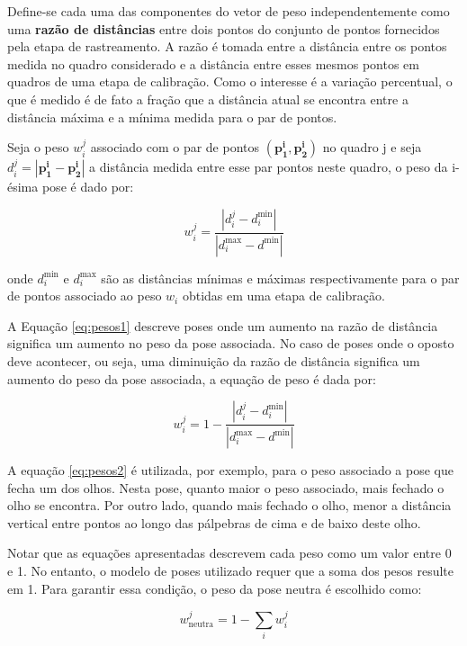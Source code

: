 Define-se cada uma das componentes do vetor de peso independentemente como uma \textbf{razão de distâncias} entre dois pontos do conjunto de pontos fornecidos pela etapa de rastreamento. A razão é tomada entre a distância entre os pontos medida no quadro considerado e a distância entre esses mesmos pontos em quadros de uma etapa de calibração. Como o interesse é a variação percentual, o que é medido é de fato a fração que a distância atual se encontra entre a distância máxima e a mínima medida para o par de pontos.

Seja o peso $w_i^j$ associado com o par de pontos $(\bm{p_1^i}, \bm{p_2^i})$ no quadro j e seja $d_i^j = |\bm{p_1^i} - \bm{p_2^i}|$ a distância medida entre esse par pontos neste quadro, o peso da i-ésima pose é dado por:

\begin{equation}
	w_i^j = \frac{|d_i^j - d_i^{\text{min}}|}{|d_i^{\text{max}} - d^{\text{min}}|}
   \label{eq:pesos1}
\end{equation}

onde $d_i^{\text{min}}$ e $d_i^{\text{max}}$ são as distâncias mínimas e máximas respectivamente para o par de pontos associado ao peso $w_i$ obtidas em uma etapa de calibração. 

A Equação \ref{eq:pesos1} descreve poses onde um aumento na razão de distância significa um aumento no peso da pose associada. No caso de poses onde o oposto deve acontecer, ou seja, uma diminuição da razão de distância significa um aumento do peso da pose associada, a equação de peso é dada por: 

\begin{equation}
	w_i^j = 1 - \frac{|d_i^j - d_i^{\text{min}}|}{|d_i^{\text{max}} - d^{\text{min}}|}
    \label{eq:pesos2}
\end{equation}

A equação \ref{eq:pesos2} é utilizada, por exemplo, para o peso associado a pose que fecha um dos olhos. Nesta pose, quanto maior o peso associado, mais fechado o olho se encontra. Por outro lado, quando mais fechado o olho, menor a distância vertical entre pontos ao longo das pálpebras de cima e de baixo deste olho.

Notar que as equações apresentadas descrevem cada peso como um valor entre 0 e 1. No entanto, o modelo de poses utilizado requer que a soma dos pesos resulte em 1. Para garantir essa condição, o peso da pose neutra é escolhido como:

\begin{equation}
	w_{\text{neutra}}^j = 1 - \sum_{i} w_i^j
    \label{eq:pesos3}
\end{equation}

